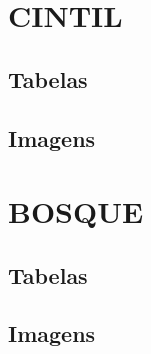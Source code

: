 \begin{apendicesenv}
\partapendices

\chapter{CINTIL}
\label{ap_cintil}

\section{Tabelas}
\label{ap_cintil_tab}

\begin{center}
    
\end{center}

\section{Imagens}
\label{ap_cintil_imagens}
\chapter{BOSQUE}
\label{ap_bosque}

\section{Tabelas}
\label{ap_bosque_tab}

\begin{center}
    
\end{center}

\begin{center}
    
\end{center}

\section{Imagens}
\begin{center}
    
\end{center}

\begin{center}
    
\end{center}

\begin{center}
    
\end{center}


\end{apendicesenv}